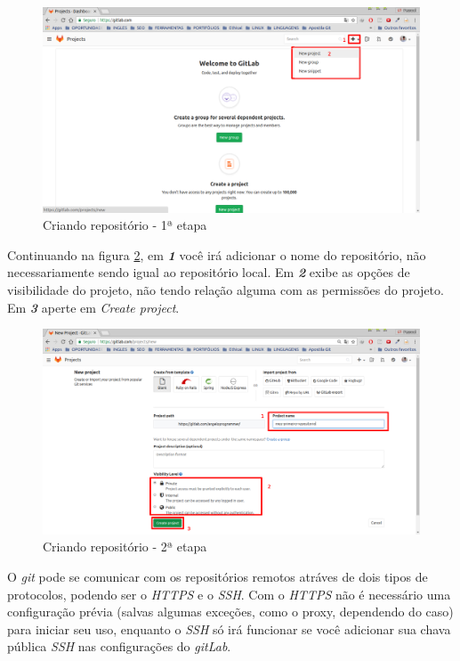 \documentclass[12pt,openright,oneside,a4paper,english,brazil]{abntex2}
\begin{document}
\begin{figure}[h]
	\caption{\label{criandorep1}Criando repositório - 1ª etapa}
	\begin{center}
		\includegraphics[width=1\linewidth]{criandorep1}
	\end{center}
\end{figure}

Continuando na figura \ref{criandorep2}, em \textbf{\textit{1}} você irá adicionar o nome do repositório, não necessariamente sendo igual ao repositório local. Em \textbf{\textit{2}} exibe as opções de visibilidade do projeto, não tendo relação alguma com as permissões do projeto. Em \textbf{\textit{3}} aperte em \textit{Create project}.

\begin{figure}[h]
	\caption{\label{criandorep2}Criando repositório - 2ª etapa}
	\begin{center}
		\includegraphics[width=1\linewidth]{criandorep2}
	\end{center}
\end{figure}

O \textit{git} pode se comunicar com os repositórios remotos atráves de dois tipos de protocolos, podendo ser o \textit{HTTPS} e o \textit{SSH}. Com o \textit{HTTPS} não é necessário uma configuração prévia (salvas algumas exceções, como o proxy, dependendo do caso) para iniciar seu uso, enquanto o \textit{SSH} só irá funcionar se você adicionar sua chava pública \textit{SSH} nas configurações do \textit{gitLab}.
\end{document}
